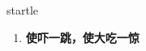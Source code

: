 
\begin{frame}
{\huge startle}
\begin{center}
\begin{enumerate}\Large
  \item \textbf{使吓一跳，使大吃一惊}
\end{enumerate}
\end{center}
\end{frame}
